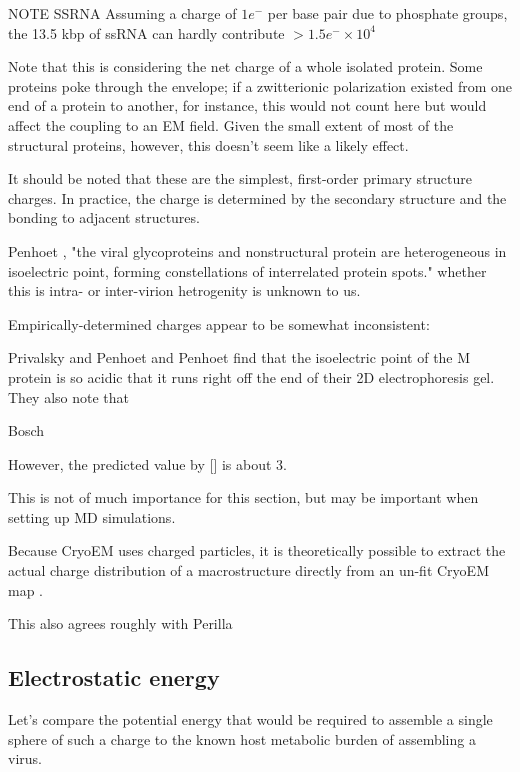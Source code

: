 \documentclass[paper.tex]{subfiles}
\begin{document}
NOTE SSRNA Assuming a charge of $1e^-$ per base pair due to phosphate groups, the 13.5 kbp of ssRNA can hardly contribute $> 1.5e^- \times10^4$



Note that this is considering the net charge of a whole isolated protein. Some proteins poke through the envelope; if a zwitterionic polarization existed from one end of a protein to another, for instance, this would not count here but would affect the coupling to an EM field. Given the small extent of most of the structural proteins, however, this doesn't seem like a likely effect.

\begin{sidenote}
	It should be noted that these are the simplest, first-order primary structure charges. In practice, the charge is determined by the secondary structure and the bonding to adjacent structures.
	
	 Penhoet \cite{Structurea}, "the viral glycoproteins and nonstructural protein are heterogeneous in isoelectric point, forming constellations of interrelated protein spots." whether this is intra- or inter-virion hetrogenity is unknown to us. 
	
	Empirically-determined charges appear to be somewhat inconsistent:
	
	Privalsky and Penhoet \cite{Influenza1978} and Penhoet \cite{Structurea} find that the isoelectric point of the M protein is so acidic that it runs right off the end of their 2D electrophoresis gel. They also note that 
	
	Bosch \cite{Studies1985}
	
	However, the predicted value by [] is about 3.
	
	This is not of much importance for this section, but may be important when setting up MD simulations.
	
	Because CryoEM uses charged particles, it is theoretically possible to extract the actual charge distribution of a macrostructure directly from an un-fit CryoEM map \cite{Identification2018}. 
\end{sidenote}

This also agrees roughly with Perilla \cite{Physical2017}


\subsection{Electrostatic energy}

Let's compare the potential energy that would be required to assemble a single sphere of such a charge to the known host metabolic burden of assembling a virus.
\end{document}

